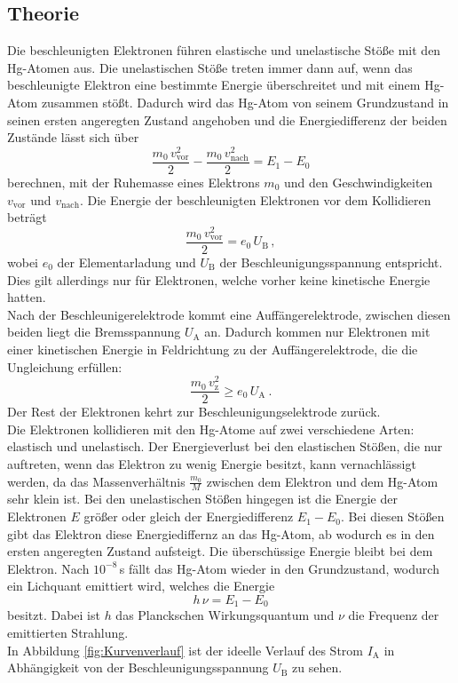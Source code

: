 \subsection{Theorie}
Die beschleunigten Elektronen führen elastische und unelastische Stöße mit den Hg-Atomen aus. Die unelastischen Stöße treten immer dann auf, wenn das beschleunigte Elektron eine bestimmte Energie überschreitet und mit einem Hg-Atom zusammen stößt. Dadurch wird das Hg-Atom von seinem Grundzustand in seinen ersten angeregten Zustand angehoben und die Energiedifferenz der beiden Zustände lässt sich über
\begin{equation}
	\frac{m_0\, v_\text{vor}^2}{2} - \frac{m_0\, v_\text{nach}^2}{2} = E_1 - E_0
\end{equation}
berechnen, mit der Ruhemasse eines Elektrons $m_0$ und den Geschwindigkeiten $v_\text{vor}$ und $v_\text{nach}$. Die Energie der beschleunigten Elektronen vor dem Kollidieren beträgt
\begin{equation}
	\frac{m_0\, v_\text{vor}^2}{2} = e_0\, U_\text{B} \, ,
\end{equation}
wobei $e_0$ der Elementarladung und $U_\text{B}$ der Beschleunigungsspannung entspricht. Dies gilt allerdings nur für Elektronen, welche vorher keine kinetische Energie hatten. \\
Nach der Beschleunigerelektrode kommt eine Auffängerelektrode, zwischen diesen beiden liegt die Bremsspannung $U_\text{A}$ an. Dadurch kommen nur Elektronen mit einer kinetischen Energie in Feldrichtung zu der Auffängerelektrode, die die Ungleichung erfüllen:
\begin{equation}
	\frac{m_0\, v_\text{z}^2}{2} \ge e_0\, U_\text{A} \ .
\end{equation}
Der Rest der Elektronen kehrt zur Beschleunigungselektrode zurück. \\
Die Elektronen kollidieren mit den Hg-Atome auf zwei verschiedene Arten: elastisch und unelastisch. Der Energieverlust bei den elastischen Stößen, die nur auftreten, wenn das Elektron zu wenig Energie besitzt, kann vernachlässigt werden, da das Massenverhältnis $\frac{m_0}{M}$ zwischen dem Elektron und dem Hg-Atom sehr klein ist. Bei den unelastischen Stößen hingegen ist die Energie der Elektronen $E$ größer oder gleich der Energiedifferenz $E_1 - E_0$. Bei diesen Stößen gibt das Elektron diese Energiediffernz an das Hg-Atom, ab wodurch es in den ersten angeregten Zustand aufsteigt. Die überschüssige Energie bleibt bei dem Elektron. Nach $10^{-8}$\,s fällt das Hg-Atom wieder in den Grundzustand, wodurch ein Lichquant emittiert wird, welches die Energie
\begin{equation}
	h\, \nu = E_1 - E_0
	\label{eqn:EE}
\end{equation}
besitzt. Dabei ist $h$ das Planckschen Wirkungsquantum und $\nu$ die Frequenz der emittierten Strahlung. \\
In Abbildung \eqref{fig:Kurvenverlauf} ist der ideelle Verlauf des Strom $I_\text{A}$ in Abhängigkeit von der Beschleunigungsspannung $U_\text{B}$ zu sehen.

